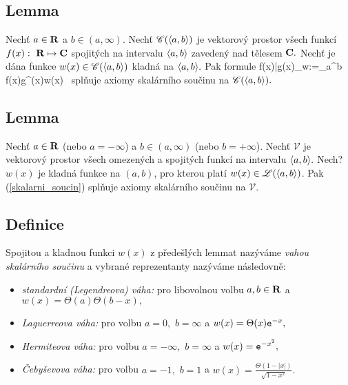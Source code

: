 \subsection{Lemma}

Nech\v t $a\in{\mathbf R}$ a $b\in(a,\infty).$ Nech\v t $\mathscr{C}(\langle a,b \rangle)$ je vektorov\'y prostor v\v sech
funkc\'i $f(x):~{\mathbf R}\mapsto{\mathbf C}$ spojit\'ych na intervalu $\langle a,b
\rangle$ zaveden\'y nad t\v elesem ${\mathbf C}.$ Nech\v t je d\'ana funkce $w(x)\in\mathscr{C}(\langle a,b \rangle)$ kladná na $\langle a,b \rangle.$ Pak formule
%
%
\BE \bla f(x)|g(x)\bra_{w}:=\int_a^b f(x)g^\star(x)w(x)~\dx 
\label{skalarni_soucin}\EE
%
spl\v nuje axiomy skal\'arn\'iho sou\v cinu na $\mathscr{C}(\langle a,b \rangle).$


\subsection{Lemma}

Nech\v t $a\in{\mathbf R}$ (nebo $a=-\infty$) a $b\in(a,\infty)$ (nebo $b=+\infty$). Nech\v t $\mathscr{V}$ je vektorov\'y prostor v\v sech omezených a spojitých
funkc\'i na intervalu $\langle a,b
\rangle.$ Nech?$w(x)$ je kladná funkce na $(a,b)$, pro kterou platí $w(x)\in{\mathscr L}(\langle a,b \rangle)$. Pak (\ref{skalarni_soucin})
spl\v nuje axiomy skal\'arn\'iho sou\v cinu na $\mathscr{V}.$


\subsection{Definice}

Spojitou a kladnou funkci $w(x)$ z p\v rede\v slých lemmat naz\'yv\'ame \emph{vahou skal\'arn\'iho sou\v cinu} a vybran\'e reprezentanty naz\'yv\'ame n\'asledovn\v e:
%
\begin{itemize}
    \item \emph{standardn\'i (Legendreova) v\'aha:} pro libovolnou volbu $a,b\in{\mathbf R}$ a $w(x)=\Theta(a)\Theta(b-x),$
    \item \emph{Laguerreova v\'aha:} pro volbu $a=0,$ $b=\infty$ a $w(x)=\Theta(x)\mathtt{e}^{-x},$
    \item \emph{Hermiteova v\'aha:} pro volbu $a=-\infty,$ $b=\infty$ a $w(x)=\mathtt{e}^{-x^2},$
    \item \emph{\v Ceby\v sevova v\'aha:} pro volbu $a=-1,$ $b=1$ a $w(x)=\frac{\Theta(1-|x|)}{\sqrt{1-x^2}}.$
\end{itemize}


